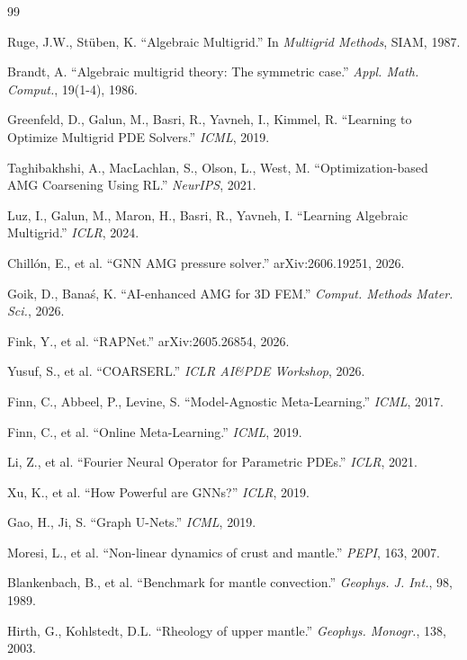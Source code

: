 \documentclass[11pt,a4paper]{ctexart}
\begin{document}
\begin{thebibliography}{99}

 Ruge, J.W., St\"{u}ben, K. ``Algebraic Multigrid.'' In \textit{Multigrid Methods}, SIAM, 1987.

 Brandt, A. ``Algebraic multigrid theory: The symmetric case.'' \textit{Appl. Math. Comput.}, 19(1-4), 1986.

 Greenfeld, D., Galun, M., Basri, R., Yavneh, I., Kimmel, R. ``Learning to Optimize Multigrid PDE Solvers.'' \textit{ICML}, 2019.

 Taghibakhshi, A., MacLachlan, S., Olson, L., West, M. ``Optimization-based AMG Coarsening Using RL.'' \textit{NeurIPS}, 2021.

 Luz, I., Galun, M., Maron, H., Basri, R., Yavneh, I. ``Learning Algebraic Multigrid.'' \textit{ICLR}, 2024.

 Chill\'{o}n, E., et al. ``GNN AMG pressure solver.'' arXiv:2606.19251, 2026.

 Goik, D., Bana\'{s}, K. ``AI-enhanced AMG for 3D FEM.'' \textit{Comput. Methods Mater. Sci.}, 2026.

 Fink, Y., et al. ``RAPNet.'' arXiv:2605.26854, 2026.

 Yusuf, S., et al. ``COARSERL.'' \textit{ICLR AI\&PDE Workshop}, 2026.

 Finn, C., Abbeel, P., Levine, S. ``Model-Agnostic Meta-Learning.'' \textit{ICML}, 2017.

 Finn, C., et al. ``Online Meta-Learning.'' \textit{ICML}, 2019.

 Li, Z., et al. ``Fourier Neural Operator for Parametric PDEs.'' \textit{ICLR}, 2021.

 Xu, K., et al. ``How Powerful are GNNs?'' \textit{ICLR}, 2019.

 Gao, H., Ji, S. ``Graph U-Nets.'' \textit{ICML}, 2019.

 Moresi, L., et al. ``Non-linear dynamics of crust and mantle.'' \textit{PEPI}, 163, 2007.

 Blankenbach, B., et al. ``Benchmark for mantle convection.'' \textit{Geophys. J. Int.}, 98, 1989.

 Hirth, G., Kohlstedt, D.L. ``Rheology of upper mantle.'' \textit{Geophys. Monogr.}, 138, 2003.


\end{thebibliography}
\end{document}
